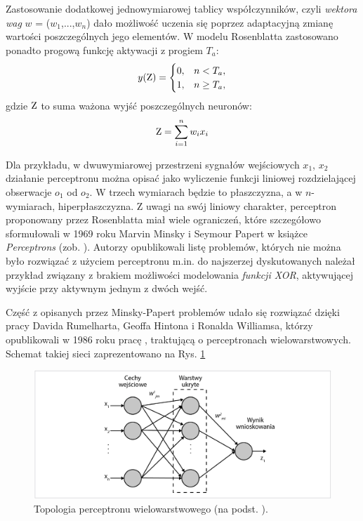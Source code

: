 Zastosowanie dodatkowej jednowymiarowej tablicy współczynników, czyli \textit{wektora wag} $w$ = ($w_1$,...,$w_n$) dało możliwość uczenia się poprzez adaptacyjną zmianę wartości poszczególnych jego elementów. W modelu Rosenblatta zastosowano ponadto progową funkcję aktywacji z progiem $T_a$:
\begin{equation}
y(\mathrm{Z})=\begin{cases} 0, & n < T_a, \\ 1, & n \ge T_a, \end{cases}
\end{equation}
gdzie $\mathrm{Z}$ to suma ważona wyjść poszczególnych neuronów:
\begin{equation}
\label{eqLinActFunc}
\mathrm{Z}=\sum_{i=1}^{n}w_i x_i
\end{equation}

Dla przykładu, w dwuwymiarowej przestrzeni sygnałów wejściowych {$x_1$, $x_2$}  działanie perceptronu można opisać jako wyliczenie funkcji liniowej rozdzielającej obserwacje $o_1$ od $o_2$. W trzech wymiarach będzie to płaszczyzna, a w $n$-wymiarach, hiperpłaszczyzna. Z uwagi na swój liniowy charakter, perceptron proponowany przez Rosenblatta miał wiele ograniczeń, które szczegółowo sformułowali w 1969 roku Marvin Minsky i Seymour Papert w książce \textit{Perceptrons} (zob. \cite{Minsky1969}). Autorzy opublikowali listę problemów, których nie można było rozwiązać z użyciem perceptronu m.in. do najszerzej dyskutowanych należał przykład związany z brakiem możliwości modelowania \textit{funkcji XOR}, aktywującej wyjście przy aktywnym jednym z dwóch wejść.

Część z opisanych przez Minsky-Papert problemów udało się rozwiązać dzięki pracy Davida Rumelharta, Geoffa Hintona i Ronalda Williamsa, którzy opublikowali w 1986 roku pracę \cite{Rumelhart1986}, traktującą o perceptronach wielowarstwowych. Schemat takiej sieci zaprezentowano na Rys. \ref{MLperceptron}
\begin{figure}[h!]
	\centering
	\includegraphics[width=1\textwidth]{figures/MLperceptron.png}
	\caption{Topologia perceptronu wielowarstwowego (na podst. \cite{Rumelhart1986}).}
	\label{MLperceptron}
\end{figure}

